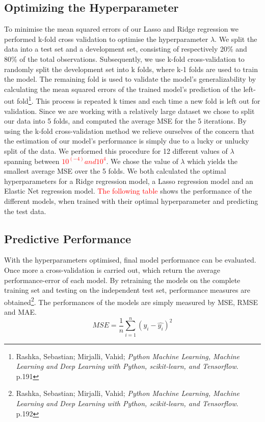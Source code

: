 \documentclass[12pt,a4paper]{article}
\begin{document}
\subsection{Optimizing the Hyperparameter}
To minimise the mean squared errors of our Lasso and Ridge regression we performed k-fold cross validation to optimise the hyperparameter $\lambda$. 
We split the data into a test set and a development set, consisting of respectively 20\% and 80\% of the total observations. Subsequently, we use k-fold cross-validation to randomly split the development set into k folds, where k-1 folds are used to train the model. The remaining fold is used to validate the model’s generalizability by calculating the mean squared errors of the trained model’s prediction of the left-out fold\footnote{Rashka, Sebastian; Mirjalli, Vahid; \textit{Python Machine Learning, Machine Learning and Deep Learning with Python, scikit-learn, and Tensorflow}. p.191}. This process is repeated k times and each time a new fold is left out for validation. Since we are working with a relatively large dataset we chose to split our data into 5 folds, and computed the average MSE for the 5 iterations. By using the k-fold cross-validation method we relieve ourselves of the concern that the estimation of our model’s performance is simply due to a lucky or unlucky split of the data. \newline
We performed this procedure for 12 different values of $\lambda$ spanning between \textcolor{red}{$10^(-4) and 10^4$}. We chose the value of $\lambda$ which yields the smallest average MSE over the 5 folds. 
We both calculated the optimal hyperparameters for a Ridge regression model, a Lasso regression model and an Elastic Net regression model. \textcolor{red}{The following table} shows the performance of the different models, when trained with their optimal hyperparameter and predicting the test data.

\subsection{Predictive Performance}
With the hyperparameters optimised, final model performance can be evaluated. Once more a cross-validation is carried out, which return the average performance-error of each model. By retraining the models on the complete training set and testing on the independent test set, performance measures are obtained\footnote{Rashka, Sebastian; Mirjalli, Vahid; \textit{Python Machine Learning, Machine Learning and Deep Learning with Python, scikit-learn, and Tensorflow}. p.192}. \newline The performances of the models are simply measured by MSE, RMSE and MAE. \newline
$$ MSE = \frac{1}{n}\sum_{i=1}^{n}(y_i-\hat{y_i})^2$$
\end{document}
